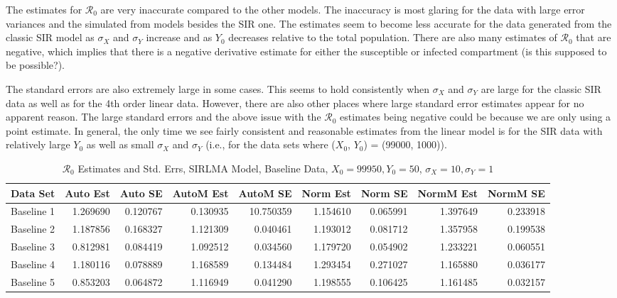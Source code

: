 \documentclass[12pt]{article}
\newcommand{\rr}{\ensuremath{\mathcal{R}_0}}
\begin{document}
The estimates for $\rr$ are very inaccurate compared to the other models. The inaccuracy is most glaring for the data with large error variances and the simulated from models besides the SIR one. The estimates seem to become less accurate for the data generated from the classic SIR model as $\sigma_X$ and $\sigma_Y$ increase and as $Y_0$ decreases relative to the total population. There are also many estimates of $\rr$ that are negative, which implies that there is a negative derivative estimate for either the susceptible or infected compartment (is this supposed to be possible?). 

The standard errors are also extremely large in some cases. This seems to hold consistently when $\sigma_X$ and $\sigma_Y$ are large for the classic SIR data as well as for the 4th order linear data. However, there are also other places where large standard error estimates appear for no apparent reason. The large standard errors and the above issue with the $\rr$ estimates being negative could be because we are only using a point estimate. In general, the only time we see fairly consistent and reasonable estimates from the linear model is for the SIR data with relatively large $Y_0$ as well as small $\sigma_X$ and $\sigma_Y$ (i.e., for the data sets where ($X_0$, $Y_0$) = (99000, 1000)).

\begin{table}[H]
	
	\caption{$\rr$ Estimates and Std. Errs, SIRLMA Model,
		Baseline Data, $X_0 = 99950, Y_0 = 50$, 
		$\sigma_X = 10, \sigma_Y = 1$}
	\begin{footnotesize}
		\hskip -1cm
		\begin{tabular}{l|r|r|r|r|r|r|r|r}
			\hline
			Data Set & Auto Est & Auto SE & AutoM Est & AutoM SE & Norm Est & Norm SE & NormM Est & NormM SE\\
			\hline
			Baseline 1 & 1.269690 & 0.120767 & 0.130935 & 10.750359 & 1.154610 & 0.065991 & 1.397649 & 0.233918\\
			\hline
			Baseline 2 & 1.187856 & 0.168327 & 1.121309 & 0.040461 & 1.193012 & 0.081712 & 1.357958 & 0.199538\\
			\hline
			Baseline 3 & 0.812981 & 0.084419 & 1.092512 & 0.034560 & 1.179720 & 0.054902 & 1.233221 & 0.060551\\
			\hline
			Baseline 4 & 1.180116 & 0.078889 & 1.168589 & 0.134484 & 1.293454 & 0.271027 & 1.165880 & 0.036177\\
			\hline
			Baseline 5 & 0.853203 & 0.064872 & 1.116949 & 0.041290 & 1.198555 & 0.106425 & 1.161485 & 0.032157\\
			\hline
		\end{tabular}
	\end{footnotesize}
\end{table}
\end{document}
